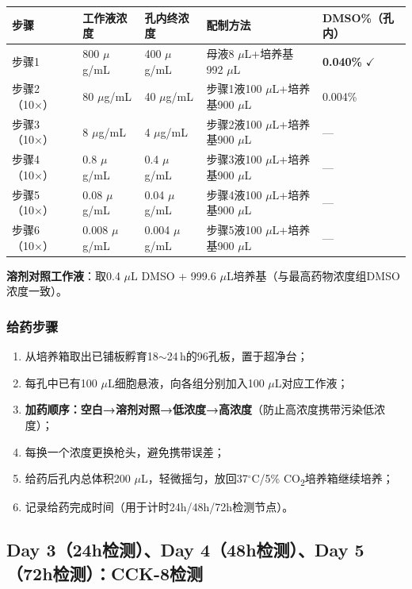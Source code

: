\documentclass[12pt,a4paper]{article}
\newcommand{\um}{\,$\mu$g/mL}
\newcommand{\degC}{$^\circ$C}
\newcommand{\uul}{\,$\mu$L}
\begin{document}
\begin{center}
\begin{tabular}{lllll}
\toprule
\rowcolor{tabheadbg}\color{white}\textbf{步骤} & \color{white}\textbf{工作液浓度} & \color{white}\textbf{孔内终浓度} & \color{white}\textbf{配制方法} & \color{white}\textbf{DMSO\%（孔内）} \\
\midrule
步骤1 & 800\,\um{} & 400\,\um{} & 母液8\,\uul{}+培养基992\,\uul{} & \textbf{0.040\%} $\checkmark$ \\
步骤2（10×）& 80\,\um{} & 40\,\um{} & 步骤1液100\,\uul{}+培养基900\,\uul{} & 0.004\% \\
步骤3（10×）& 8\,\um{} & 4\,\um{} & 步骤2液100\,\uul{}+培养基900\,\uul{} & — \\
步骤4（10×）& 0.8\,\um{} & 0.4\,\um{} & 步骤3液100\,\uul{}+培养基900\,\uul{} & — \\
步骤5（10×）& 0.08\,\um{} & 0.04\,\um{} & 步骤4液100\,\uul{}+培养基900\,\uul{} & — \\
步骤6（10×）& 0.008\,\um{} & 0.004\,\um{} & 步骤5液100\,\uul{}+培养基900\,\uul{} & — \\
\bottomrule
\end{tabular}
\end{center}

\textbf{溶剂对照工作液}：取0.4\,\uul{} DMSO + 999.6\,\uul{}培养基（与最高药物浓度组DMSO浓度一致）。

\subsubsection{给药步骤}

\begin{enumerate}
\item 从培养箱取出已铺板孵育18$\sim$24\,h的96孔板，置于超净台；
\item 每孔中已有100\,\uul{}细胞悬液，向各组分别加入100\,\uul{}对应工作液；
\item \textbf{加药顺序：空白→溶剂对照→低浓度→高浓度}（防止高浓度携带污染低浓度）；
\item 每换一个浓度更换枪头，避免携带误差；
\item 给药后孔内总体积200\,\uul{}，轻微摇匀，放回37\degC{}/5\% CO\textsubscript{2}培养箱继续培养；
\item 记录给药完成时间（用于计时24h/48h/72h检测节点）。
\end{enumerate}

\subsection{Day 3（24h检测）、Day 4（48h检测）、Day 5（72h检测）：CCK-8检测}
\end{document}
